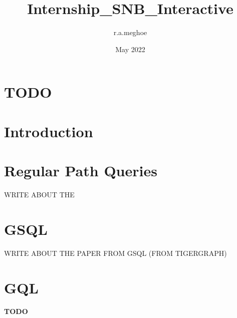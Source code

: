 \documentclass{article}
\title{Internship_SNB_Interactive}
\author{r.a.meghoe }
\date{May 2022}
\begin{document}
\section{TODO}

\section{Introduction}
\section{Regular Path Queries}
WRITE ABOUT THE 
\section{GSQL}
WRITE ABOUT THE PAPER FROM GSQL (FROM TIGERGRAPH)
\section{GQL}


















\textbf{TODO}










\end{document}
